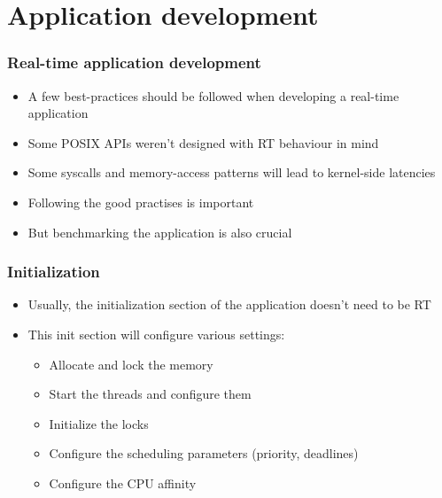 \section{Application development}

\begin{frame}
\frametitle{Real-time application development}
	\begin{itemize}
		\item A few best-practices should be followed when developing a real-time application
		\item Some POSIX APIs weren't designed with RT behaviour in mind
		\item Some syscalls and memory-access patterns will lead to kernel-side latencies
		\item Following the good practises is important
		\item But benchmarking the application is also crucial
	\end{itemize}
\end{frame}

\begin{frame}
	\frametitle{Initialization}
	\begin{itemize}
		\item Usually, the initialization section of the application doesn't need to be RT
		\item This init section will configure various settings:
			\begin{itemize}
				\item Allocate and lock the memory
				\item Start the threads and configure them
				\item Initialize the locks
				\item Configure the scheduling parameters (priority, deadlines)
				\item Configure the CPU affinity
			\end{itemize}

	\end{itemize}
\end{frame}

